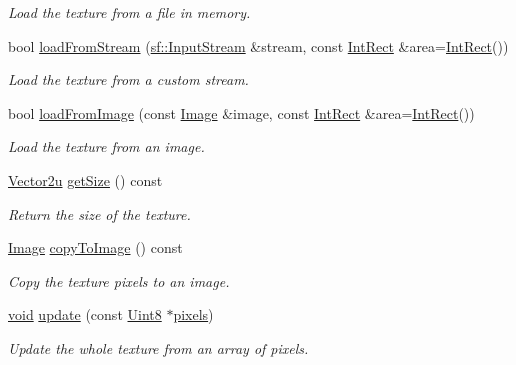 \begin{DoxyCompactItemize}
\begin{DoxyCompactList}\small\item\em Load the texture from a file in memory. \end{DoxyCompactList}\item 
bool \hyperlink{classsf_1_1_texture_a6803a13465a7113a8964d1081841886d}{load\-From\-Stream} (\hyperlink{classsf_1_1_input_stream}{sf\-::\-Input\-Stream} \&stream, const \hyperlink{namespacesf_aae67411782674934f78d55fa3af18403}{Int\-Rect} \&area=\hyperlink{namespacesf_aae67411782674934f78d55fa3af18403}{Int\-Rect}())
\begin{DoxyCompactList}\small\item\em Load the texture from a custom stream. \end{DoxyCompactList}\item 
bool \hyperlink{classsf_1_1_texture_abec4567ad9856a3596dc74803f26fba2}{load\-From\-Image} (const \hyperlink{classsf_1_1_image}{Image} \&image, const \hyperlink{namespacesf_aae67411782674934f78d55fa3af18403}{Int\-Rect} \&area=\hyperlink{namespacesf_aae67411782674934f78d55fa3af18403}{Int\-Rect}())
\begin{DoxyCompactList}\small\item\em Load the texture from an image. \end{DoxyCompactList}\item 
\hyperlink{namespacesf_aaa02ba42bf79b001a376fe9d79254cb3}{Vector2u} \hyperlink{classsf_1_1_texture_a0f370acd8f41c8b97a6959389c521c2c}{get\-Size} () const 
\begin{DoxyCompactList}\small\item\em Return the size of the texture. \end{DoxyCompactList}\item 
\hyperlink{classsf_1_1_image}{Image} \hyperlink{classsf_1_1_texture_aefc19bcd95565dd2348fd4cec0facddc}{copy\-To\-Image} () const 
\begin{DoxyCompactList}\small\item\em Copy the texture pixels to an image. \end{DoxyCompactList}\item 
\hyperlink{glutf90_8h_ac778d6f63f1aaf8ebda0ce6ac821b56e}{void} \hyperlink{classsf_1_1_texture_ae4eab5c6781316840b0c50ad08370963}{update} (const \hyperlink{namespacesf_a4ef3d630785c4f296f9b4f274c33d78e}{Uint8} $\ast$\hyperlink{gl3_8h_ada7ad693ea2e311b8103f4693fc35f80}{pixels})
\begin{DoxyCompactList}\small\item\em Update the whole texture from an array of pixels. \end{DoxyCompactList}\item 

\end{DoxyCompactItemize}
